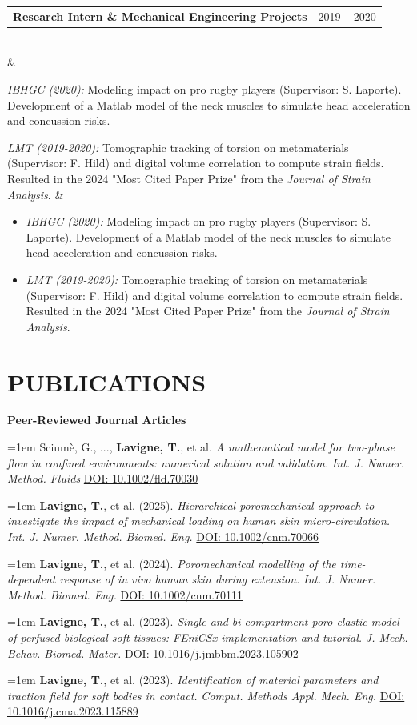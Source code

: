 \documentclass[10pt, a4paper]{article}
\makeatletter
\newcommand{\cventry}[4]{%
  \noindent
  \begin{tabularx}{\linewidth}{@{}Xr@{}}
    {\fontsize{11.5}{12.5}\selectfont\textbf{#1}} & \textcolor{medgray}{#2}
  \end{tabularx}\\[0pt]
  \noindent{\textit{\textcolor{darkgray}{#3}}}
  \vspace{-4pt}
  \ifx&#4&\else
    \begin{itemize}#4\end{itemize}
  \fi
  \vspace{3pt}
}
\newcommand{\pubentry}[1]{%
  \noindent\hangindent=1em\hangafter=1 #1\par\vspace{3pt}
}
\makeatother
\begin{document}
\cventry{Research Intern \& Mechanical Engineering Projects}{2019 – 2020}%
{IBHGC (ENSAM Paris, France) \& LMT Laboratory (ENS Paris-Saclay, France)}{%
  \item \textit{IBHGC (2020):} Modeling impact on pro rugby players (Supervisor: S. Laporte). Development of a Matlab model of the neck muscles to simulate head acceleration and concussion risks.
  \item \textit{LMT (2019-2020):} Tomographic tracking of torsion on metamaterials (Supervisor: F. Hild) and digital volume correlation to compute strain fields. Resulted in the 2024 "Most Cited Paper Prize" from the \textit{Journal of Strain Analysis}.
}

\section{PUBLICATIONS}

\textbf{Peer-Reviewed Journal Articles}

\pubentry{Sciumè, G., ..., \textbf{Lavigne, T.}, et al. \textit{A mathematical model for two-phase flow in confined environments: numerical solution and validation.} \textit{Int. J. Numer. Method. Fluids} \href{https://doi.org/10.1002/fld.70030}{DOI: 10.1002/fld.70030}}

\pubentry{\textbf{Lavigne, T.}, et al. (2025). \textit{Hierarchical poromechanical approach to investigate the impact of mechanical loading on human skin micro-circulation.} \textit{Int. J. Numer. Method. Biomed. Eng.} \href{https://doi.org/10.1002/cnm.70066}{DOI: 10.1002/cnm.70066}}

\pubentry{\textbf{Lavigne, T.}, et al. (2024). \textit{Poromechanical modelling of the time-dependent response of in vivo human skin during extension.} \textit{Int. J. Numer. Method. Biomed. Eng.} \href{https://doi.org/10.1002/cnm.70111}{DOI: 10.1002/cnm.70111}}

\pubentry{\textbf{Lavigne, T.}, et al. (2023). \textit{Single and bi-compartment poro-elastic model of perfused biological soft tissues: FEniCSx implementation and tutorial.} \textit{J. Mech. Behav. Biomed. Mater.} \href{https://doi.org/10.1016/j.jmbbm.2023.105902}{DOI: 10.1016/j.jmbbm.2023.105902}}

\pubentry{\textbf{Lavigne, T.}, et al. (2023). \textit{Identification of material parameters and traction field for soft bodies in contact.} \textit{Comput. Methods Appl. Mech. Eng.} \href{https://doi.org/10.1016/j.cma.2023.115889}{DOI: 10.1016/j.cma.2023.115889}}
\end{document}
